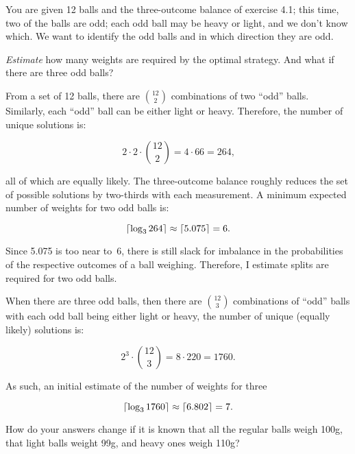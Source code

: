 \begin{problem}{4}{14}
  You are given 12 balls and the three-outcome balance of exercise 4.1; this time, two of the balls are odd; each odd ball may be heavy or light, and we don't know which.  We want to identify the odd balls and in which direction they are odd.
\end{problem}

\begin{subproblem}
  \textit{Estimate} how many weights are required by the optimal strategy.  And what if there are three odd balls?
\end{subproblem}

  From a set of 12 balls, there are $\binom{12}{2}$ combinations of two ``odd'' balls.  Similarly, each ``odd'' ball can be either light or heavy.  Therefore, the number of unique solutions is: 
  
  \[ 2\cdot 2 \cdot \binom{12}{2} = 4 \cdot 66 = 264 \text{,} \]
  
  all of which are equally likely.  The three-outcome balance roughly reduces the set of possible solutions by two-thirds with each measurement.  A minimum expected number of weights for two odd balls is:
  
  \[ \lceil \log_{3} 264 \rceil \approx \lceil 5.075 \rceil = 6 \text{.} \]
  
  Since 5.075 is too near to~6, there is still slack for imbalance in the probabilities of the respective outcomes of a ball weighing.  Therefore, I estimate  splits are required for two odd balls.

  When there are three odd balls, then there are $\binom{12}{3}$ combinations of ``odd'' balls with each odd ball being either light or heavy, the number of unique (equally likely) solutions is:
  
  \[ 2^3 \cdot \binom{12}{3} = 8 \cdot 220 = 1760 \text{.} \]

  As such, an initial estimate of the number of weights for three 

  \[ \lceil \log_{3} 1760 \rceil \approx \lceil 6.802 \rceil = 7 \text{.} \]

\begin{subproblem}
  How do your answers change if it is known that all the regular balls weigh 100g, that light balls weight 99g, and heavy ones weigh 110g?
\end{subproblem}


